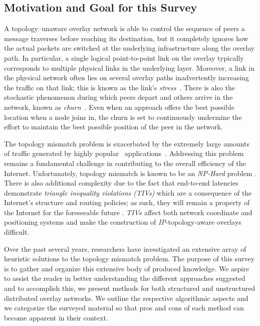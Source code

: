\subsection{Motivation and Goal for this Survey}
\label{background:motivation}
A topology--unaware overlay network is able to control the sequence of peers a
message traverses before reaching its destination, but it completely ignores
how the actual packets are switched at the underlying infrastructure along
the overlay path. 
In particular, a single logical point-to-point link on the
overlay typically corresponds to multiple physical links in the
underlying layer. 
Moreover, a link in the physical network often lies
on several overlay paths inadvertently increasing the traffic on that
link; this is known as the link's \emph{stress}~\cite{CRSZ2002}. 
There is also the stochastic phenomenon during which peers 
depart and others arrive in the network, known 
as \emph{churn}~\cite{stutzbach_churn_2006}.
Even when an approach offers the best possible location
when a node joins in, the churn is set to  
continuously undermine the effort to maintain the best possible position
of the  peer in the network.

The topology mismatch problem is exacerbated by the extremely large amounts of
traffic generated by highly popular \p\ applications~\cite{byl-book}.
Addressing this problem remains a fundamental challenge 
in contributing to the overall efficiency of the Internet. 
Unfortunately, topology mismatch is known to be 
an \emph{NP-Hard} problem \cite{C2000,NPBOOK}. 
There is also additional complexity due to the fact that 
end-to-end latencies demonstrate \emph{triangle inequality
violations (TIVs)} which are a consequence of the Internet's structure and
routing policies; as such, they will remain a property of the Internet 
for the foreseeable future \cite{zheng_irprtt_2005}. 
\emph{TIV}s affect both network coordinate
\cite{cox_vivaldi_2004,WSS2005} and positioning \cite{ng_gnp_2001}
systems and make the construction of \emph{IP}-topology-aware 
overlays difficult.

Over the past several years, researchers have investigated an extensive
array of heuristic solutions to the topology mismatch problem. 
The purpose of this survey is to gather and organize 
this extensive body of produced knowledge. 
We aspire to assist the reader in better understanding the 
different approaches suggested and to accomplish this, we 
present methods for both structured and unstructured distributed 
overlay networks.
We outline the respective algorithmic aspects and we categorize
the surveyed material so that pros and cons of each method
can become apparent in their context.

